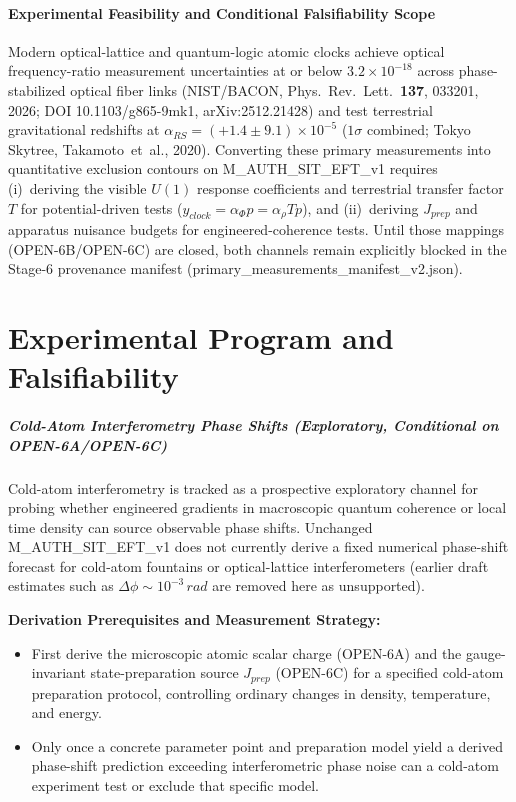 \documentclass[american,11pt,letterpaper]{article}
\def\mathcal#1{#1}%
\def\mathrm#1{#1}%
\def\texttt#1{#1}%
\def\emph#1{#1}%
\begin{document}
\subsection{Experimental Feasibility and Conditional Falsifiability Scope}

Modern optical-lattice and quantum-logic atomic clocks achieve optical frequency-ratio measurement uncertainties at or below $3.2\times 10^{-18}$ across phase-stabilized optical fiber links (NIST/BACON, \emph{Phys.\ Rev.\ Lett.}\ \textbf{137}, 033201, 2026; DOI \texttt{10.1103/g865-9mk1}, \texttt{arXiv:2512.21428}) and test terrestrial gravitational redshifts at $\alpha_{\mathrm{RS}} = (+1.4 \pm 9.1)\times 10^{-5}$ ($1\sigma$ combined; Tokyo Skytree, Takamoto~\emph{et~al.}, 2020). Converting these primary measurements into quantitative exclusion contours on \texttt{M\_AUTH\_SIT\_EFT\_v1} requires (i)~deriving the visible $U(1)$ response coefficients and terrestrial transfer factor $\mathcal{T}$ for potential-driven tests ($y_{\mathrm{clock}} = \alpha_\Phi p = \alpha_\rho\mathcal{T} p$), and (ii)~deriving $J_{\mathrm{prep}}$ and apparatus nuisance budgets for engineered-coherence tests. Until those mappings (\texttt{OPEN-6B}/\texttt{OPEN-6C}) are closed, both channels remain explicitly blocked in the Stage-6 provenance manifest (\texttt{primary\_measurements\_manifest\_v2.json}).
\part{Experimental Program and Falsifiability}

\subsubsection{Cold-Atom Interferometry Phase Shifts (Exploratory, Conditional on \texttt{OPEN-6A}/\texttt{OPEN-6C})}

Cold-atom interferometry is tracked as a prospective exploratory channel for probing whether engineered gradients in macroscopic quantum coherence or local time density can source observable phase shifts. Unchanged \texttt{M\_AUTH\_SIT\_EFT\_v1} does \emph{not} currently derive a fixed numerical phase-shift forecast for cold-atom fountains or optical-lattice interferometers (earlier draft estimates such as $\Delta\phi \sim 10^{-3}\,\mathrm{rad}$ are removed here as unsupported).

\textbf{Derivation Prerequisites and Measurement Strategy:}
\begin{itemize}
    \item First derive the microscopic atomic scalar charge (\texttt{OPEN-6A}) and the gauge-invariant state-preparation source $J_{\mathrm{prep}}$ (\texttt{OPEN-6C}) for a specified cold-atom preparation protocol, controlling ordinary changes in density, temperature, and energy.
    \item Only once a concrete parameter point and preparation model yield a derived phase-shift prediction exceeding interferometric phase noise can a cold-atom experiment test or exclude that specific model.
\end{itemize}
\end{document}
